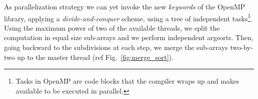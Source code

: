 \documentclass{standalone}
\begin{document}
As parallelization strategy we can yet invoke the new \emph{keywords} of the OpenMP library, applying a \emph{divide-and-conquer} scheme, using a tree of independent \textsf{tasks}\footnote{
  Tasks in OpenMP are code blocks that the compiler wraps up and makes available to be executed in parallel.
}.
Using the maximum power of two of the available threads, we split the computation in equal size sub-arrays and we perform independent \textsf{argsort}s.
Then, going backward to the subdivisions at each step, we merge the sub-arrays two-by-two up to the master thread (ref Fig.~\ref{fig:merge_sort}).
\end{document}
